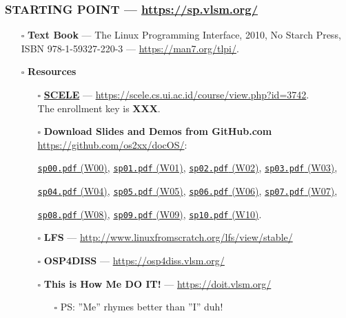 \begin{frame}[fragile]
\frametitle{\textbf{STARTING POINT} --- 
{
\hypersetup{colorlinks,linkcolor=,urlcolor=links}
\url{https://sp.vlsm.org/}
}
}
\begin{itemize}
\item[$\square$] \textbf{Text Book} ---
The Linux Programming Interface, 2010, No Starch Press, 
ISBN 978-1-59327-220-3 --- \url{https://man7.org/tlpi/}. 
\item[$\square$] \textbf{Resources}
\begin{itemize}
\item[$\square$] \href{https://scele.cs.ui.ac.id/course/view.php?id=3742}{\textbf{SCELE}} ---
\url{https://scele.cs.ui.ac.id/course/view.php?id=3742}.\\
The enrollment key is \textbf{XXX}.
\item[$\square$] \textbf{Download Slides and Demos from GitHub.com} \\
\url{https://github.com/os2xx/docOS/}:

                 {\scriptsize%
                 \href{https://docOS.vlsm.org/SPSlides/sp00.pdf}{\texttt{sp00.pdf} (W00)},
                 \href{https://docOS.vlsm.org/SPSlides/sp01.pdf}{\texttt{sp01.pdf} (W01)},
                 \href{https://docOS.vlsm.org/SPSlides/sp02.pdf}{\texttt{sp02.pdf} (W02)},
                 \href{https://docOS.vlsm.org/SPSlides/sp03.pdf}{\texttt{sp03.pdf} (W03)},

                 \href{https://docOS.vlsm.org/SPSlides/sp04.pdf}{\texttt{sp04.pdf} (W04)},
                 \href{https://docOS.vlsm.org/SPSlides/sp05.pdf}{\texttt{sp05.pdf} (W05)},
                 \href{https://docOS.vlsm.org/SPSlides/sp06.pdf}{\texttt{sp06.pdf} (W06)},
                 \href{https://docOS.vlsm.org/SPSlides/sp07.pdf}{\texttt{sp07.pdf} (W07)},

                 \href{https://docOS.vlsm.org/SPSlides/sp08.pdf}{\texttt{sp08.pdf} (W08)},
                 \href{https://docOS.vlsm.org/SPSlides/sp09.pdf}{\texttt{sp09.pdf} (W09)},
                 \href{https://docOS.vlsm.org/SPSlides/sp10.pdf}{\texttt{sp10.pdf} (W10)}.
                 }
\item[$\square$] \textbf{LFS} --- \url{http://www.linuxfromscratch.org/lfs/view/stable/}
\item[$\square$] \textbf{OSP4DISS} --- \url{https://osp4diss.vlsm.org/}
\item[$\square$] \textbf{This is How Me DO IT!} --- \url{https://doit.vlsm.org/}
\begin{itemize}
\item[$\square$] PS: ''Me'' rhymes better than ''I'' duh!
\end{itemize}
\end{itemize}
\end{itemize}
\end{frame}

